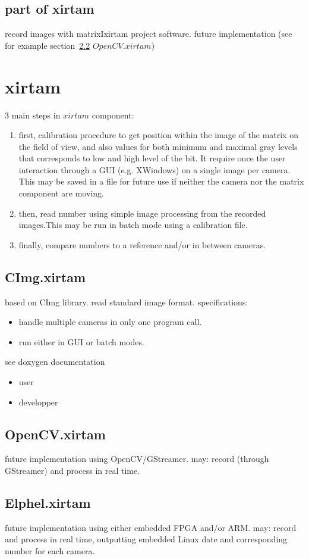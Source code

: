 \documentclass[10pt,a4paper]{report}
\begin{document}
\section{part of xirtam}
record images with matrixIxirtam project software.
future implementation (see for example section~\ref{OpenCV.xirtam} $OpenCV.xirtam$)

\chapter{xirtam}
3 main steps in $xirtam$ component:
\begin{enumerate}
\item first, calibration procedure to get position within the image of the matrix on the field of view, and also values for both minimum and maximal gray levels that corresponds to low and high level of the bit. It require once the user interaction through a GUI (e.g. XWindows) on a single image per camera. This may be saved in a file for future use if neither the camera nor the matrix component are moving.
\item then, read number using simple image processing from the recorded images.This may be run in batch mode using a calibration file.
\item finally, compare numbers to a reference and/or in between cameras.
\end{enumerate}
\section{CImg.xirtam}\label{CImg.xirtam} 
based on CImg library.
read standard image format.
specifications:
\begin{itemize}
\item handle multiple cameras in only one program call.
\item run either in GUI or batch modes.
\end{itemize}
see doxygen documentation
\begin{itemize}
\item user
\item developper
\end{itemize}
\section{OpenCV.xirtam}\label{OpenCV.xirtam} 
future implementation using OpenCV/GStreamer.
may: record (through GStreamer) and process in real time.
\section{Elphel.xirtam}
future implementation using either embedded FPGA and/or ARM.
may: record and process in real time, outputting embedded Linux date and corresponding number for each camera.
\end{document}
